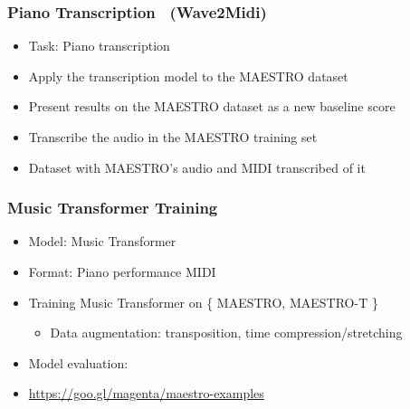 \documentclass[dvipdfmx]{beamer}
\begin{document}
\begin{frame}
    \frametitle{Piano Transcription \ (Wave2Midi)}
    \begin{itemize}
        \item Task: Piano transcription
        \item Apply the transcription model to the MAESTRO dataset
        \item Present results on the MAESTRO dataset as a new baseline score
    \end{itemize}
    \begin{itemize}
        \item Transcribe the audio in the MAESTRO training set
        \item Dataset with MAESTRO's audio and MIDI transcribed of it
    \end{itemize}
\end{frame}


\begin{frame}
    \frametitle{Music Transformer Training}
    \begin{itemize}
        \item Model: Music Transformer \cite{musictransformer}
        \item Format: Piano performance MIDI
    \end{itemize}
    \begin{itemize}
        \item Training Music Transformer on \{ MAESTRO, MAESTRO-T \}
        \begin{itemize}
            \item Data augmentation: transposition, time compression/stretching
        \end{itemize}
        \item Model evaluation:
    \end{itemize}
    \begin{itemize}
        \item {\scriptsize \url{https://goo.gl/magenta/maestro-examples}}
    \end{itemize}
\end{frame}
\end{document}
